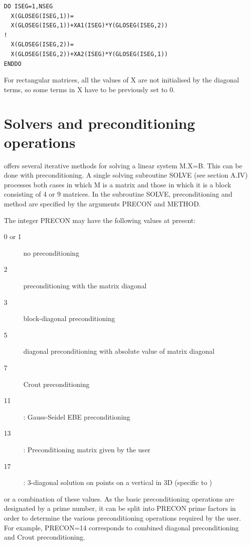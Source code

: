 \begin{lstlisting}[language=TelFortran]
DO ISEG=1,NSEG
  X(GLOSEG(ISEG,1))=
  X(GLOSEG(ISEG,1))+XA1(ISEG)*Y(GLOSEG(ISEG,2))
!
  X(GLOSEG(ISEG,2))=
  X(GLOSEG(ISEG,2))+XA2(ISEG)*Y(GLOSEG(ISEG,1))
ENDDO
\end{lstlisting}

For rectangular matrices, all the values of X are not initialised by the
diagonal terms, so some terms in X have to be previously set to 0.

\section{Solvers and preconditioning operations}

\bief offers several iterative methods for solving a linear system M.X=B. This
can be done with preconditioning. A single solving subroutine SOLVE (see
section A.IV) processes both cases in which M is a matrix and those in which it
is a block consisting of 4 or 9 matrices. In the subroutine SOLVE,
preconditioning and method are specified by the arguments PRECON and METHOD.

The integer PRECON may have the following values at present:

\begin{description}
  \item [0 or 1] no preconditioning

  \item [2] preconditioning with the matrix diagonal
  \item [3] block-diagonal preconditioning
  \item [5] diagonal preconditioning with absolute value of matrix diagonal
  \item [7] Crout preconditioning
  \item [11]: Gauss-Seidel EBE preconditioning
  \item [13]: Preconditioning matrix given by the user
  \item [17]: 3-diagonal solution on points on a vertical in 3D (specific to
    )
\end{description}

or a combination of these values. As the basic preconditioning operations are
designated by a prime number, it can be split into PRECON prime factors in
order to determine the various preconditioning operations required by the user.
For example, PRECON=14 corresponds to combined diagonal preconditioning and
Crout preconditioning.

